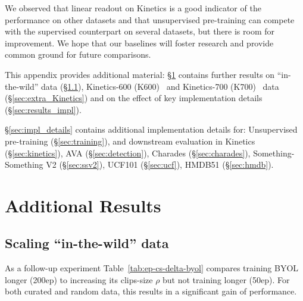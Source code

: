 \documentclass[final]{cvpr}
\newcommand{\tblref}[1]{Table~\ref{#1}}
\begin{document}
	We observed that linear readout on Kinetics  is a good indicator of the performance on other datasets and that unsupervised pre-training can compete with the supervised counterpart on several datasets, but there is  room for improvement. 		
	We hope that our baselines will foster research and provide common ground for future comparisons. 

	\appendix
	\cleardoublepage
	
	
	This appendix provides additional material:
	\S\ref{sec:extra_results} contains further results on ``in-the-wild'' data (\S\ref{sec:extra_IG}), Kinetics-600 (K600)~\cite{carreira2018short} and Kinetics-700 (K700)~\cite{Carreira19} data (\S\ref{sec:extra_Kinetics}) and on the effect of key implementation details (\S\ref{sec:results_impl}).
	
	\S\ref{sec:impl_details} contains additional implementation details  for: Unsupervised pre-training (\S\ref{sec:training}), and downstream evaluation in Kinetics (\S\ref{sec:kinetics}), AVA   (\S\ref{sec:detection}),  Charades (\S\ref{sec:charades}), Something-Something V2 (\S\ref{sec:ssv2}), UCF101 (\S\ref{sec:ucf}), HMDB51 (\S\ref{sec:hmdb}).
	
	
	
	\section{Additional Results} \label{sec:extra_results}
	\subsection{Scaling ``in-the-wild'' data} \label{sec:extra_IG}
	
	As a follow-up experiment \tblref{tab:ep-cs-delta-byol} compares training BYOL longer (200ep) to increasing its clips-size $\rho$ but not training longer (50ep). For both  curated and  random data, this results in a significant gain of performance. 
	
\end{document}
